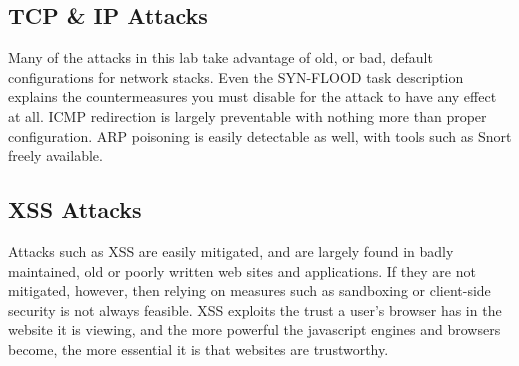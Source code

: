 \subsection{TCP \& IP Attacks}

Many of the attacks in this lab take advantage of old, or bad, default configurations for network stacks. Even the
SYN-FLOOD task description explains the countermeasures you must disable for the attack to have any effect at all. ICMP
redirection is largely preventable with nothing more than proper configuration\cite{sysctl}.
ARP poisoning is easily detectable as well, with tools such as Snort freely available\cite{snort}\cite{snort_arp}.

\subsection{XSS Attacks}

Attacks such as XSS are easily mitigated\cite{cheatsheet}, and are largely found in badly maintained, old or poorly
written web sites and applications. If they are not mitigated, however, then relying on measures such as sandboxing or
client-side security is not always feasible. XSS exploits the trust a user's browser has in the website it is viewing,
and the more powerful the javascript engines and browsers  become, the more essential it is that websites are
trustworthy.
